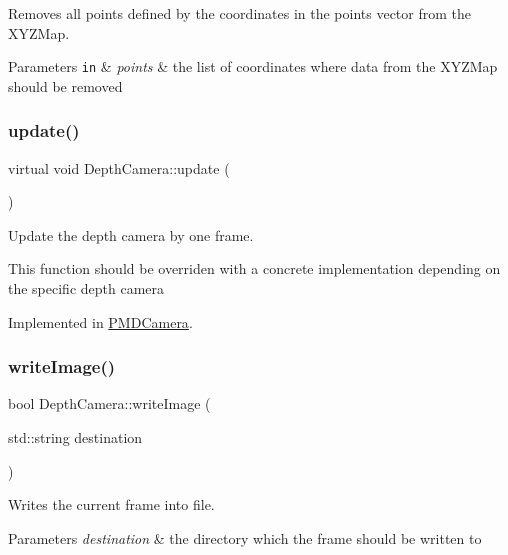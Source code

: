 Removes all points defined by the coordinates in the points vector from the X\+Y\+Z\+Map. 


\begin{DoxyParams}[1]{Parameters}
\mbox{\tt in}  & {\em points} & the list of coordinates where data from the X\+Y\+Z\+Map should be removed \\
\hline
\end{DoxyParams}
\hypertarget{class_depth_camera_abae1b9f37a00b17f00ff983ebb43ffc5}{}\label{class_depth_camera_abae1b9f37a00b17f00ff983ebb43ffc5} 
\subsubsection{\texorpdfstring{update()}{update()}}
{\footnotesize\ttfamily virtual void Depth\+Camera\+::update (\begin{DoxyParamCaption}{ }\end{DoxyParamCaption})\hspace{0.3cm}{\ttfamily [pure virtual]}}



Update the depth camera by one frame. 

This function should be overriden with a concrete implementation depending on the specific depth camera 

Implemented in \hyperlink{class_p_m_d_camera_aa6cb9398f9635436b4384ee2043def40}{P\+M\+D\+Camera}.

\hypertarget{class_depth_camera_a599dceaab9e673762b9ab76cf1e4f413}{}\label{class_depth_camera_a599dceaab9e673762b9ab76cf1e4f413} 
\subsubsection{\texorpdfstring{write\+Image()}{writeImage()}}
{\footnotesize\ttfamily bool Depth\+Camera\+::write\+Image (\begin{DoxyParamCaption}\item[{std\+::string}]{destination }\end{DoxyParamCaption})}



Writes the current frame into file. 


\begin{DoxyParams}{Parameters}
{\em destination} & the directory which the frame should be written to \\
\hline
\end{DoxyParams}


